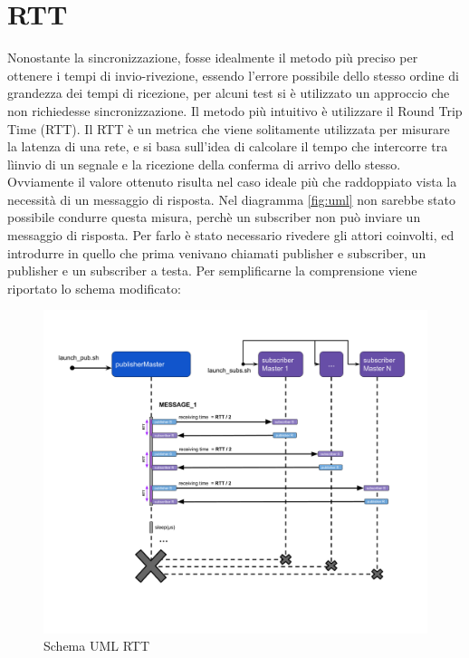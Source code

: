 \section{RTT}\label{sec:timeRTT}
Nonostante la sincronizzazione, fosse idealmente il metodo più preciso per ottenere i tempi di invio-rivezione, essendo l'errore possibile dello stesso ordine di grandezza dei tempi di ricezione, per alcuni test si è utilizzato un approccio che non richiedesse sincronizzazione. Il metodo più intuitivo è utilizzare il Round Trip Time (RTT).
Il RTT è un metrica che viene solitamente utilizzata per misurare la latenza di una rete, e si basa sull'idea di calcolare il tempo che intercorre tra lìinvio di un segnale e la ricezione della conferma di arrivo dello stesso. Ovviamente il valore ottenuto risulta nel caso ideale più che raddoppiato vista la necessità di un messaggio di risposta. Nel diagramma \ref{fig:uml} non sarebbe stato possibile condurre questa misura, perchè un subscriber non può inviare un messaggio di risposta.
Per farlo è stato necessario rivedere gli attori coinvolti, ed introdurre in quello che prima venivano chiamati publisher e subscriber, un publisher e un subscriber a testa.
Per semplificarne la comprensione viene riportato lo schema modificato:

\begin{figure}[H]
    \includegraphics[width=\textwidth]{./img/RTT.png}
    \caption{Schema UML RTT}
    \label{fig:rtt_uml}
\end{figure} 

